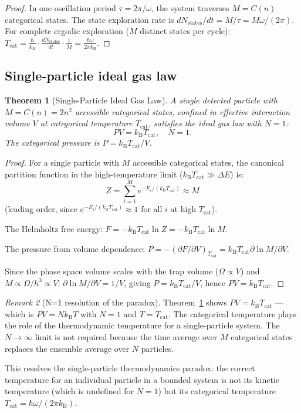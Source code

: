 \documentclass[twocolumn,10pt,a4paper]{article}
\theoremstyle{thmstyle}
\newtheorem{theorem}{Theorem}[section]
\theoremstyle{definition}
\theoremstyle{remark}
\newtheorem{remark}[theorem]{Remark}
\newcommand{\kB}{k_{\mathrm{B}}}
\begin{document}
\begin{proof}
In one oscillation period $\tau = 2\pi/\omega$, the system traverses
$M = C(n)$ categorical states. The state exploration rate is
$dN_{\mathrm{states}}/dt = M/\tau = M\omega/(2\pi)$.
For complete ergodic exploration ($M$ distinct states per cycle):
$T_{\mathrm{cat}} = \frac{\hbar}{k_B} \cdot \frac{dN_{\mathrm{states}}}{dt}
\cdot \frac{1}{M} = \frac{\hbar\omega}{2\pi\kB}$.
\end{proof}

\subsection{Single-particle ideal gas law}

\begin{theorem}[Single-Particle Ideal Gas Law]
\label{thm:single_gas}
A single detected particle with $M = C(n) = 2n^2$ accessible categorical
states, confined in effective interaction volume $V$ at categorical
temperature $T_{\mathrm{cat}}$, satisfies the ideal gas law with $N = 1$:
\begin{equation}
PV = \kB T_{\mathrm{cat}}, \quad N = 1.
\label{eq:single_gas}
\end{equation}
The categorical pressure is $P = \kB T_{\mathrm{cat}}/V$.
\end{theorem}

\begin{proof}
For a single particle with $M$ accessible categorical states, the canonical
partition function in the high-temperature limit ($\kB T_{\mathrm{cat}} \gg \Delta E$) is:
\[
Z = \sum_{i=1}^M e^{-E_i/(\kB T_{\mathrm{cat}})} \approx M
\]
(leading order, since $e^{-E_i/(\kB T_{\mathrm{cat}})} \approx 1$ for all $i$
at high $T_{\mathrm{cat}}$).

The Helmholtz free energy: $F = -\kB T_{\mathrm{cat}}\ln Z = -\kB T_{\mathrm{cat}}\ln M$.

The pressure from volume dependence:
$P = -(\partial F/\partial V)_{T_{\mathrm{cat}}} = \kB T_{\mathrm{cat}} \partial\ln M/\partial V$.

Since the phase space volume scales with the trap volume ($\Omega \propto V$)
and $M \propto \Omega/h^3 \propto V$:
$\partial\ln M/\partial V = 1/V$,
giving $P = \kB T_{\mathrm{cat}}/V$, hence $PV = \kB T_{\mathrm{cat}}$.
\end{proof}

\begin{remark}[N=1 resolution of the paradox]
Theorem~\ref{thm:single_gas} shows $PV = \kB T_{\mathrm{cat}}$ — which is
$PV = N\kB T$ with $N = 1$ and $T = T_{\mathrm{cat}}$.
The categorical temperature plays the role of the thermodynamic temperature
for a single-particle system. The $N \to \infty$ limit is not required because
the time average over $M$ categorical states replaces the ensemble average
over $N$ particles.

This resolves the single-particle thermodynamics paradox: the correct
temperature for an individual particle in a bounded system is not its
kinetic temperature (which is undefined for $N = 1$) but its categorical
temperature $T_{\mathrm{cat}} = \hbar\omega/(2\pi\kB)$.
\end{remark}
\end{document}
